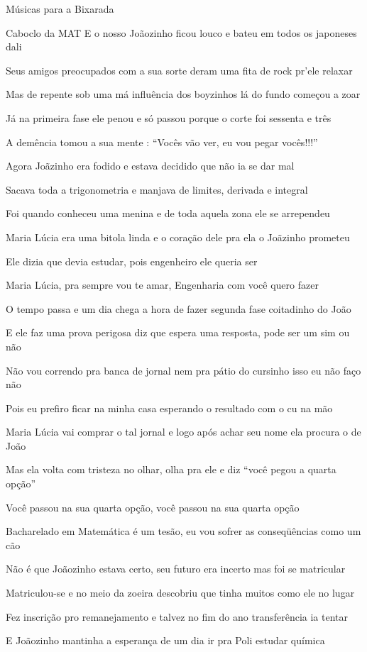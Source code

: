 \begin{secao}{Músicas para a Bixarada}
\begin{subsecao}{Caboclo da MAT}
E o nosso Joãozinho ficou louco e bateu em todos os japoneses dali

Seus amigos preocupados com a sua sorte deram uma fita de rock pr'ele relaxar

Mas de repente sob uma má influência dos boyzinhos lá do fundo começou a zoar

Já na primeira fase ele penou e só passou porque o corte foi sessenta e três

A demência tomou a sua mente : ``Vocês vão ver, eu vou pegar vocês!!!''

Agora Joãzinho era fodido e estava decidido que não ia se dar mal

Sacava toda a trigonometria e manjava de limites, derivada e integral

Foi quando conheceu uma menina e de toda aquela zona ele se arrependeu

Maria Lúcia era uma bitola linda e o coração dele pra ela o Joãzinho prometeu

Ele dizia que devia estudar, pois engenheiro ele queria ser

Maria Lúcia, pra sempre vou te amar, Engenharia com você quero fazer

O tempo passa e um dia chega a hora de fazer segunda fase coitadinho do João

E ele faz uma prova perigosa diz que espera uma resposta, pode ser um sim ou não

Não vou correndo pra banca de jornal nem pra pátio do cursinho isso eu não faço
não

Pois eu prefiro ficar na minha casa esperando o resultado com o cu na mão

Maria Lúcia vai comprar o tal jornal e logo após achar seu nome ela procura o de
João

Mas ela volta com tristeza no olhar, olha pra ele e diz ``você pegou a quarta
opção''

Você passou na sua quarta opção, você passou na sua quarta opção

Bacharelado em Matemática é um tesão, eu vou sofrer as conseqüências como um cão

Não é que Joãozinho estava certo, seu futuro era incerto mas foi se matricular

Matriculou-se e no meio da zoeira descobriu que tinha muitos como ele no lugar

Fez inscrição pro remanejamento e talvez no fim do ano transferência ia tentar

E Joãozinho mantinha a esperança de um dia ir pra Poli estudar química


\end{subsecao}
\end{secao}
